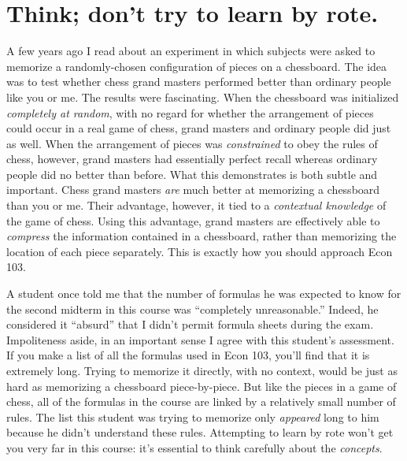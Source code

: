 \documentclass[12pt,letterpaper]{article}
\begin{document}
\section{Think; don't try to learn by rote.}
A few years ago I read about an experiment in which subjects were asked to memorize a randomly-chosen configuration of pieces on a chessboard. The idea was to test whether chess grand masters performed better than ordinary people like you or me. The results were fascinating. When the chessboard was initialized \emph{completely at random}, with no regard for whether the arrangement of pieces could occur in a real game of chess, grand masters and ordinary people did just as well. When the arrangement of pieces was \emph{constrained} to obey the rules of chess, however, grand masters had essentially perfect recall whereas ordinary people did no better than before. What this demonstrates is both subtle and important. Chess grand masters \emph{are} much better at memorizing a chessboard than you or me. Their advantage, however, it tied to a \emph{contextual knowledge} of the game of chess. Using this advantage, grand masters are effectively able to \emph{compress} the information contained in a chessboard, rather than memorizing the location of each piece separately. This is exactly how you should approach Econ 103.

A student once told me that the number of formulas he was expected to know for the second midterm in this course was ``completely unreasonable.'' Indeed, he considered it ``absurd'' that I didn't permit formula sheets during the exam. Impoliteness aside, in an important sense I agree with this student's assessment. If you make a list of all the formulas used in Econ 103, you'll find that it is extremely long. Trying to memorize it directly, with no context, would be just as hard as memorizing a chessboard piece-by-piece. But like the pieces in a game of chess, all of the formulas in the course are linked by a relatively small number of rules. The list this student was trying to memorize only \emph{appeared} long to him because he didn't understand these rules. Attempting to learn by rote won't get you very far in this course: it's essential to think carefully about the \emph{concepts}.
\end{document}
